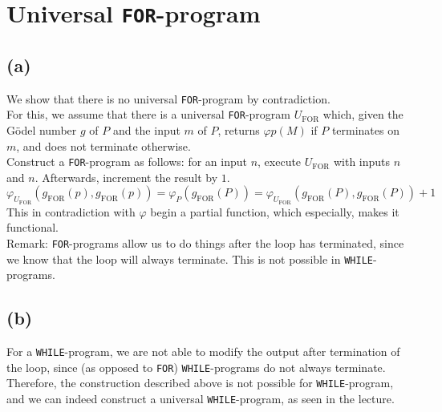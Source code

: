 



\section{Universal \lstinline|FOR|-program}

\subsection{(a)}
We show that there is no universal \lstinline|FOR|-program by contradiction.\\
For this, we assume that there is a universal \lstinline|FOR|-program $U_{\text{FOR}}$ which, given the Gödel number $g$ of $P$ and the input $m$ of $P$, returns $\varphi p(M)$ if $P$ terminates on $m$, and does not terminate otherwise.\\
Construct a \lstinline|FOR|-program as follows: for an input $n$, execute $U_{\text{FOR}}$ with inputs $n$ and $n$. Afterwards, increment the result by $1$.\\
$$\varphi_{U_{\text{FOR}}} (g_{\text{FOR}}(p), g_{\text{FOR}}(p)) = \varphi_{P}(g_{\text{FOR}}(P)) = \varphi_{U_{\text{FOR}}}(g_{\text{FOR}}(P), g_{\text{FOR}}(P)) + 1$$
This in contradiction with $\varphi$ begin a partial function, which especially, makes it functional.\\
Remark: \lstinline|FOR|-programs allow us to do things after the loop has terminated, since we know that the loop will always terminate. This is not possible in \lstinline|WHILE|-programs.\\


\subsection{(b)}
For a \lstinline|WHILE|-program, we are not able to modify the output after termination of the loop, since (as opposed to \lstinline|FOR|) \lstinline|WHILE|-programs do not always terminate.\\
Therefore, the construction described above is not possible for \lstinline|WHILE|-program, and we can indeed construct a universal \lstinline|WHILE|-program, as seen in the lecture.


